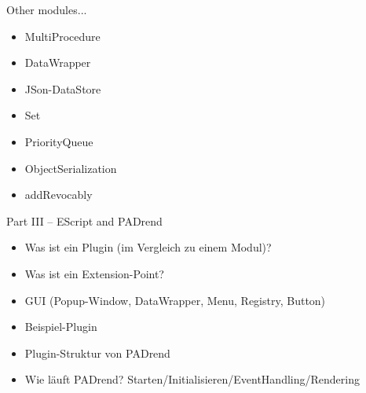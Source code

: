 \documentclass[ucs,9pt]{beamer}
\begin{document}
%
\begin{frame}[fragile]{Other modules...}
\begin{itemize}
\item MultiProcedure
\item DataWrapper
\item JSon-DataStore
\item Set
\item PriorityQueue
\item ObjectSerialization
\item addRevocably
\end{itemize}
\end{frame}

\begin{frame}[fragile]{Part III -- EScript and PADrend}
\begin{itemize}
\item Was ist ein Plugin (im Vergleich zu einem Modul)? 
\item Was ist ein Extension-Point?
\item GUI (Popup-Window, DataWrapper, Menu, Registry, Button)
\item Beispiel-Plugin
\item Plugin-Struktur von PADrend
\item Wie läuft PADrend? Starten/Initialisieren/EventHandling/Rendering
\end{itemize}
\end{frame}
%
%
%
%
%
%
\end{document}
